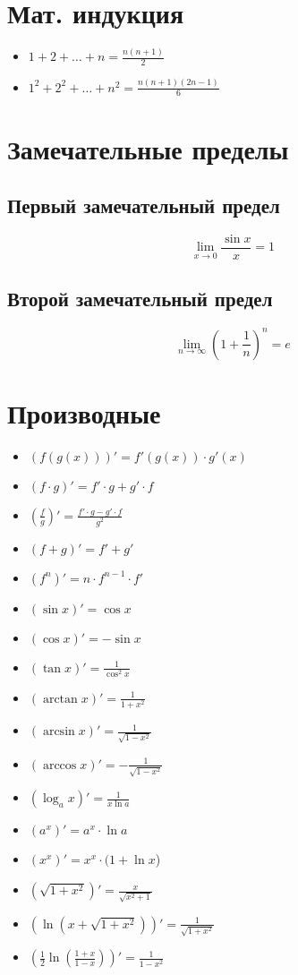 \documentclass{article}
\begin{document}
    \section{Мат. индукция}
    \begin{itemize}
	\item $1 + 2 + \dots + n = \frac{n(n+1)}{2}$
	\item $1^2 + 2^2 + \dots + n^2 = \frac{n(n+1)(2n-1)}{6} $	
    \end{itemize}
    \section{Замечательные пределы}
    \subsection{Первый замечательный предел}
    $$ \lim_{x \to 0} \frac{\sin{x}}{x} = 1 $$
    \subsection{Второй замечательный предел}
    $$ \lim_{n \to \infty} \left(1 + \frac{1}{n} \right)^n = e $$

    \section{Производные}
    \begin{itemize}
	\item $(f(g(x)))' = f'(g(x)) \cdot g'(x)$
	\item $(f \cdot g)' = f' \cdot g + g' \cdot f$
	\item $\left( \frac{f}{g} \right)' = \frac{f' \cdot g -g' \cdot f}{g^2}$
	\item $(f + g)' = f' + g'$
	\item $(f^n)' = n \cdot f^{n-1} \cdot f'$
	\item $(\sin{x} )' = \cos{x}$
	\item $(\cos{x} )' = - \sin{x}$
	\item $( \tan{x} )' = \frac{1}{\cos^2{x}}$
	\item $(\arctan x)' = \frac{1}{1+x^2}$
	\item $(\arcsin x)' = \frac{1}{\sqrt{1-x^2}}$
	\item $(\arccos x)' = -\frac{1}{\sqrt{1-x^2}}$
	\item $(\log_a{x})' = \frac{1}{x\ln{a}}$
	\item $(a^x)'= a^x \cdot \ln{a}$
	\item $(x^x)'=x^x \cdot ( 1+ \ln{x}$)
	\item $(\sqrt{1+x^2})' = \frac{x}{\sqrt{x^2+1}}$
	\item $(\ln(x+\sqrt{1+x^2}))'=\frac{1}{\sqrt{1+x^2}}$
	\item $\left(\frac{1}{2}\ln\left(\frac{1+x}{1-x}\right)\right)' = \frac{1}{1-x^2}$
	\end{itemize}
\end{document}
